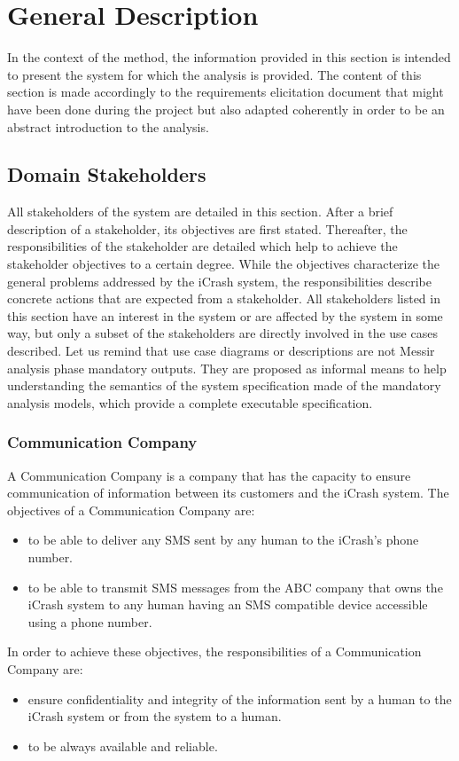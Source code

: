 
\chapter{General Description}
In the context of the \msrmessir method, the information provided in this
section is intended to present the system for which the \msrmessir analysis is
provided. The content of this section is made accordingly to the requirements
elicitation document that might have been done during the project but also
adapted coherently in order to be an abstract introduction to the \msrmessir
analysis.

\section{Domain Stakeholders}
All stakeholders of the system are detailed in this section. After a brief
description of a stakeholder, its objectives are first stated. Thereafter, the
responsibilities of the stakeholder are detailed which help to achieve the
stakeholder objectives to a certain degree. While the objectives characterize
the general problems addressed by the iCrash system, the responsibilities
describe concrete actions that are expected from a stakeholder. All stakeholders
listed in this section have an interest in the system or are affected by the
system in some way, but only a subset of the stakeholders are directly involved
in the use cases described. Let us remind that use case diagrams or descriptions
are not Messir analysis phase mandatory outputs. They are proposed as informal
means to help understanding the semantics of the system specification made of
the mandatory analysis models, which provide a complete executable
specification.

\subsection{Communication Company}
A Communication Company is a company that has the capacity to ensure
communication of information between its customers and the iCrash system. The
objectives of a Communication Company are:
\begin{itemize}
\item to be able to deliver any SMS sent by any human to the iCrash's phone
number.
\item to be able to transmit SMS messages from the ABC company that owns the
iCrash system to any human having an SMS compatible device accessible using a
phone number.
\end{itemize}
In order to achieve these objectives, the responsibilities of a Communication
Company are:
\begin{itemize}
\item ensure confidentiality and integrity of the information sent by a human
to the iCrash system or from the system to a human.
\item to be always available and reliable.
\end{itemize}
